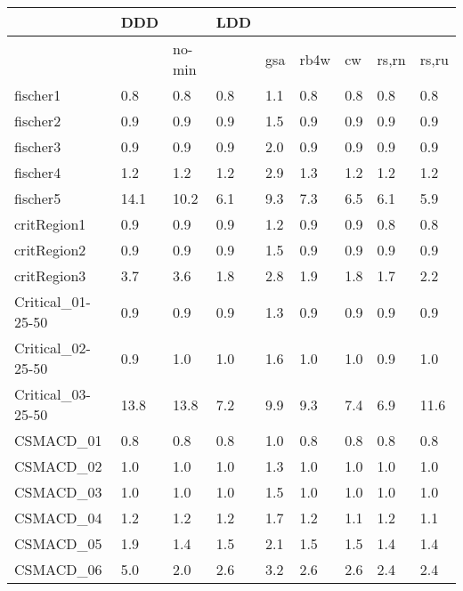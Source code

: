 \begin{table}
\begin{adjustbox}{max totalheight=\textheight}
    \begin{tabular}{|l|ll|llllll|}
    \hline
    ~                  & DDD   & ~      & LDD  & ~    & ~    & ~    & ~     & ~     \\ \hline
    ~                  & ~     & no-min & ~    & gsa  & rb4w & cw   & rs,rn & rs,ru \\ \hline
    fischer1           & 0.8   & 0.8    & 0.8  & 1.1  & 0.8  & 0.8  & 0.8   & 0.8   \\
    fischer2           & 0.9   & 0.9    & 0.9  & 1.5  & 0.9  & 0.9  & 0.9   & 0.9   \\
    fischer3           & 0.9   & 0.9    & 0.9  & 2.0  & 0.9  & 0.9  & 0.9   & 0.9   \\
    fischer4           & 1.2   & 1.2    & 1.2  & 2.9  & 1.3  & 1.2  & 1.2   & 1.2   \\
    fischer5           & 14.1  & 10.2   & 6.1  & 9.3  & 7.3  & 6.5  & 6.1   & 5.9   \\
    critRegion1        & 0.9   & 0.9    & 0.9  & 1.2  & 0.9  & 0.9  & 0.8   & 0.8   \\
    critRegion2        & 0.9   & 0.9    & 0.9  & 1.5  & 0.9  & 0.9  & 0.9   & 0.9   \\
    critRegion3        & 3.7   & 3.6    & 1.8  & 2.8  & 1.9  & 1.8  & 1.7   & 2.2   \\ \hline
    Critical\_01-25-50 & 0.9   & 0.9    & 0.9  & 1.3  & 0.9  & 0.9  & 0.9   & 0.9   \\
    Critical\_02-25-50 & 0.9   & 1.0    & 1.0  & 1.6  & 1.0  & 1.0  & 0.9   & 1.0   \\
    Critical\_03-25-50 & 13.8  & 13.8   & 7.2  & 9.9  & 9.3  & 7.4  & 6.9   & 11.6  \\ \hline
    CSMACD\_01         & 0.8   & 0.8    & 0.8  & 1.0  & 0.8  & 0.8  & 0.8   & 0.8   \\
    CSMACD\_02         & 1.0   & 1.0    & 1.0  & 1.3  & 1.0  & 1.0  & 1.0   & 1.0   \\
    CSMACD\_03         & 1.0   & 1.0    & 1.0  & 1.5  & 1.0  & 1.0  & 1.0   & 1.0   \\
    CSMACD\_04         & 1.2   & 1.2    & 1.2  & 1.7  & 1.2  & 1.1  & 1.2   & 1.1   \\
    CSMACD\_05         & 1.9   & 1.4    & 1.5  & 2.1  & 1.5  & 1.5  & 1.4   & 1.4   \\
    CSMACD\_06         & 5.0   & 2.0    & 2.6  & 3.2  & 2.6  & 2.6  & 2.4   & 2.4   \\

\end{tabular}
\end{adjustbox}
\end{table}

